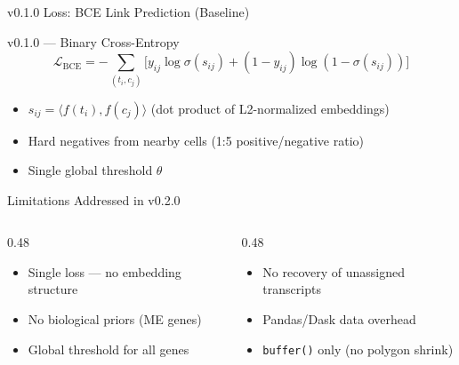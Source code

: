 \documentclass[aspectratio=169,10pt]{beamer}
\newcommand{\Lcal}{\mathcal{L}}
\newcommand{\inner}[2]{\langle #1, #2 \rangle}
\begin{document}
\begin{frame}{v0.1.0 Loss: BCE Link Prediction (Baseline)}

\begin{block}{v0.1.0 --- Binary Cross-Entropy}
\vspace{-0.2cm}
\[
  \Lcal_{\text{BCE}} = -\!\sum_{(t_i, c_j)} \big[ y_{ij}\log\sigma(s_{ij}) + (1 - y_{ij})\log(1 - \sigma(s_{ij})) \big]
\]
\end{block}

\vspace{0.1cm}

{\small
\begin{itemize}\setlength\itemsep{2pt}
  \item $s_{ij} = \inner{f(t_i)}{f(c_j)}$ \quad (dot product of L2-normalized embeddings)
  \item Hard negatives from nearby cells (1:5 positive/negative ratio)
  \item Single global threshold $\theta$
\end{itemize}
}

\vspace{0.15cm}
\begin{alertblock}{Limitations Addressed in v0.2.0}
\begin{columns}[T]
\begin{column}{0.48\textwidth}
{\small
\begin{itemize}\setlength\itemsep{1pt}
  \item Single loss --- no embedding structure
  \item No biological priors (ME genes)
  \item Global threshold for all genes
\end{itemize}
}
\end{column}
\begin{column}{0.48\textwidth}
{\small
\begin{itemize}\setlength\itemsep{1pt}
  \item No recovery of unassigned transcripts
  \item Pandas/Dask data overhead
  \item \texttt{buffer()} only (no polygon shrink)
\end{itemize}
}
\end{column}
\end{columns}
\end{alertblock}
\end{frame}

\end{document}
